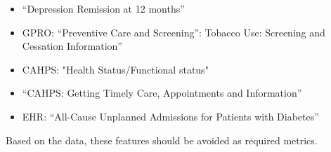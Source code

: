 \documentclass[conference]{IEEEtran}
\begin{document}
\begin{itemize}
\item 
“Depression Remission at 12 months”

\item 
GPRO: “Preventive Care and Screening”: Tobacco Use: Screening and Cessation Information”  %

\item 
CAHPS: "Health Status/Functional status"
\item 
“CAHPS: Getting Timely Care, Appointments and Information”

\item 
EHR: “All-Cause Unplanned Admissions for Patients with Diabetes”
\end{itemize}

Based on the data, these features should be avoided as required metrics.


\end{document}
